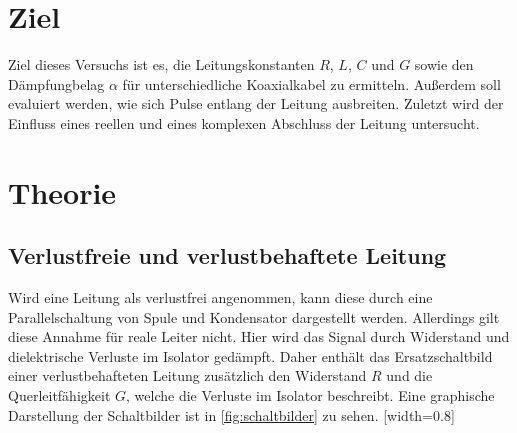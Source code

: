 \section{Ziel}
\label{sec:Ziel}
Ziel dieses Versuchs ist es, die Leitungskonstanten $R$, $L$, $C$ und $G$ sowie den Dämpfungbelag $\alpha$ für unterschiedliche Koaxialkabel zu ermitteln. Außerdem soll evaluiert werden, wie sich Pulse entlang der Leitung ausbreiten. Zuletzt wird der Einfluss eines reellen und eines komplexen Abschluss der Leitung untersucht.

\section{Theorie}
\label{sec:theorie}
\subsection{Verlustfreie und verlustbehaftete Leitung}
Wird eine Leitung als verlustfrei angenommen, kann diese durch eine Parallelschaltung von Spule und Kondensator dargestellt werden. Allerdings gilt diese Annahme für reale Leiter nicht. Hier wird das Signal durch Widerstand und dielektrische Verluste im Isolator gedämpft. Daher enthält das Ersatzschaltbild einer verlustbehafteten Leitung zusätzlich den Widerstand $R$ und die Querleitfähigkeit $G$, welche die Verluste im Isolator beschreibt. Eine graphische Darstellung der Schaltbilder ist in \autoref{fig:schaltbilder} zu sehen.
[width=0.8\textwidth]

